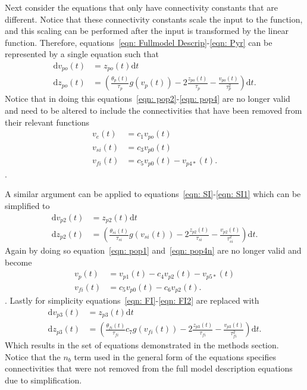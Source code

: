 Next consider the equations that only have connectivity constants that are different. Notice that these connectivity constants scale the input to the function, and this scaling can be performed after the input is transformed by the linear function. Therefore, equations~\ref{eqn: Fullmodel Descrip}-\ref{eqn: Pyr} can be represented by a single equation such that
\begin{align}
\mathrm{d}v_{po}(t)&= z_{po}(t)\mathrm{d}t\\
\mathrm{d}z_{po}(t)&=\left(\frac{\theta_{p}(t)}{\tau_{p}}g(v_{p}(t))-2\frac{z_{po}(t)}{\tau_{p}}-\frac{v_{po}(t)}{\tau_{p}^{2}}\right)\mathrm{d}t.
\end{align} Notice that in doing this equations~\ref{eqn: pop2}-\ref{eqn: pop4} are no longer valid and need to be altered to include the connectivities that have been removed from their relevant functions
\begin{align}
\label{eqn: pop2n}
v_{e}(t) &= c_{1}v_{po}(t)\\
\label{eqn: pop3n}
v_{si}(t) &= c_{3}v_{p0}(t)\\
\label{eqn: pop4n}
v_{fi}(t) &= c_{5}v_{p0}(t)-v_{p4*}(t).
\end{align}. 

A similar argument can be applied to equations~\ref{eqn: SI}-\ref{eqn: SI1} which can be simplified to
\begin{align}
\mathrm{d}v_{p2}(t)&= z_{p2}(t)\mathrm{d}t\\
\mathrm{d}z_{p2}(t)&=\left(\frac{\theta_{si}(t)}{\tau_{si}}g(v_{si}(t))-2\frac{z_{p2}(t)}{\tau_{si}}-\frac{v_{p2}(t)}{\tau_{si}^{2}}\right)\mathrm{d}t.
\end{align} Again by doing so equation~\ref{eqn: pop1} and~\ref{eqn: pop4n} are no longer valid and become
\begin{align}
v_{p}(t) &= v_{p1}(t)-c_{4}v_{p2}(t)-v_{p5*}(t)\\
v_{fi}(t) &= c_{5}v_{p0}(t)-c_{6}v_{p2}(t).
\end{align}. Lastly for simplicity equations~\ref{eqn: FI}-\ref{eqn: FI2} are replaced with
\begin{align}
\mathrm{d}v_{p3}(t)&= z_{p3}(t)\mathrm{d}t\\
\label{eqn: FI1}
\mathrm{d}z_{p3}(t)&=\left(\frac{\theta_{fi}(t)}{\tau_{fi}}c_{7}g(v_{fi}(t))-2\frac{z_{p3}(t)}{\tau_{fi}}-\frac{v_{p3}(t)}{\tau_{fi}^{2}}\right)\mathrm{d}t.
\end{align} Which results in the set of equations demonstrated in the methods section. Notice that the $n_{b}$ term used in the general form of the equations specifies connectivities that were not removed from the full model description equations due to simplification.

